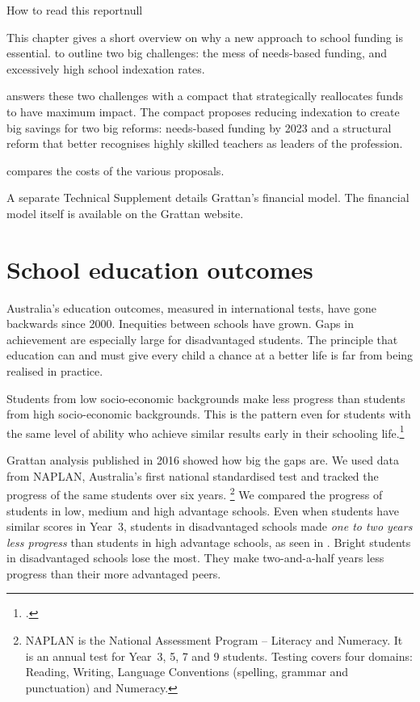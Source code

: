 \documentclass{grattan}
\begin{document}
\begin{addsmallbox}[p]{How to read this report}{null}

This chapter gives a short overview on why a new approach to school funding is essential.
 to  outline two big challenges: the mess of needs-based funding, and excessively high school indexation rates.

 answers these two challenges with a compact that strategically reallocates funds to have maximum impact.
The compact proposes reducing indexation to create big savings for two big reforms: needs-based funding by 2023 and a structural reform that better recognises highly skilled teachers as leaders of the profession.

 compares the costs of the various proposals.

A separate Technical Supplement details Grattan's financial model.
The financial model itself is available on the Grattan website.
\end{addsmallbox}

\section{School education outcomes}\label{sec:school-education-outcomes}
Australia's education outcomes, measured in international tests, have gone backwards since 2000.
Inequities between schools have grown.
Gaps in achievement are especially large for disadvantaged students. The principle that education can and must give every child a chance at a better life is far from being realised in practice.

Students from low socio-economic backgrounds make less progress than students from high socio-economic backgrounds. This is the pattern even for students with the same level of ability who achieve similar results early in their schooling life.\footcite{Goss2016Wideninggapswhat}

Grattan analysis published in 2016 showed how big the gaps are.
We used data from NAPLAN, Australia's first national standardised test and tracked the progress of the same students over six years.%
\footnote{NAPLAN is the National Assessment Program -- Literacy and Numeracy.
It is an annual test for Year~3, 5, 7 and 9 students.
Testing covers four domains: Reading, Writing, Language Conventions (spelling, grammar and punctuation) and Numeracy.}
We compared the progress of students in low, medium and high advantage schools.
Even when students have similar scores in Year~3, students in disadvantaged schools made \emph{one to two years less progress} than students in high advantage schools, as seen in .
Bright students in disadvantaged schools lose the most.
They make two-and-a-half years less progress than their more advantaged peers.
\end{document}
